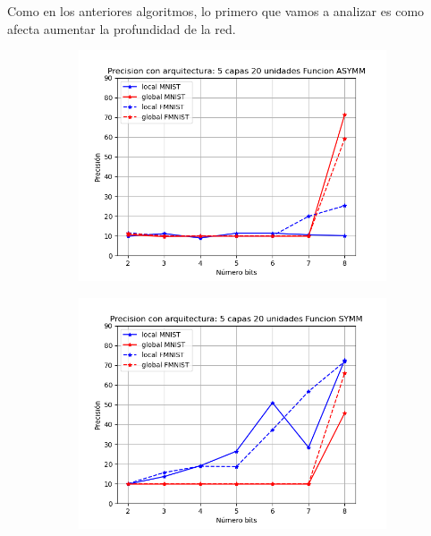 Como en los anteriores algoritmos, lo primero que vamos a analizar es como afecta aumentar la profundidad de la red.
\begin{figure}[H]
    \centering
    \begin{subfigure}[H]{0.475\textwidth}
    \includegraphics[width=\textwidth]{imagenes/fa/Precision con arquitectura: 5 capas 20 unidades Funcion ASYMM.png}
    \end{subfigure}
    \begin{subfigure}[H]{0.475\textwidth}
    \includegraphics[width=\textwidth]{imagenes/fa/Precision con arquitectura: 5 capas 20 unidades Funcion SYMM.png}
    \end{subfigure}
\end{figure}

